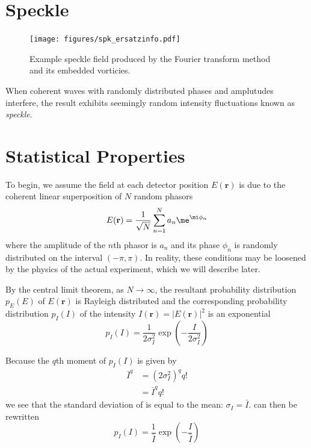 \section{Speckle}
\begin{figure}[ht]
\centering
\texttt{[image: figures/spk\_ersatzinfo.pdf]}
\caption{Example speckle field produced by the Fourier transform method and
its embedded vorticies.}
\end{figure}
When coherent waves with randomly distributed phases and amplutudes
interfere, the result exhibits seemingly random intensity fluctuations
known as \textit{speckle}.  

\section{Statistical Properties}
To begin, we assume the field at each detector position $E(\mathbf{r})$ is
due to the coherent linear superposition of $N$ random phasors
\begin{equation}
E(\mathbf{r}) = \frac{1}{\sqrt{N}} \sum_{n=1}^{N} a_n \me^{\mi \phi_n}
\end{equation}
where the amplitude of the $n$th phasor is $a_n$ and its phase $\phi_n$ is
randomly distributed on the interval $(-\pi,\pi)$.  In reality, these
conditions may be loosened by the physics of the actual experiment, which
we will describe later.

By the central limit theorem, as $N\to\infty$, the resultant probability
distribution $p_E(E)$ of $E(\mathbf{r})$ is Rayleigh distributed and the
corresponding probability distribution $p_I(I)$ of the intensity
$I(\mathbf{r})=|E(\mathbf{r})|^2$ is an exponential
\begin{equation}
p_I(I) = \frac{1}{2\sigma_I^2}\exp\left(-\frac{I}{2\sigma_I^2}\right)
\label{eqn:propexp}
\end{equation}

Because the $q$th moment of $p_I(I)$ is given by 
\begin{align}
\bar{I}^q&=(2\sigma_I^2)^q q!\\
         &=\bar{I}^q q!
\end{align}
we see that the standard deviation of is equal to the mean: 
$\sigma_I=\bar{I}$.   can then be rewritten
\begin{equation}
p_I(I) = \frac{1}{\bar{I}}\exp\left(-\frac{I}{\bar{I}}\right)
\end{equation}

